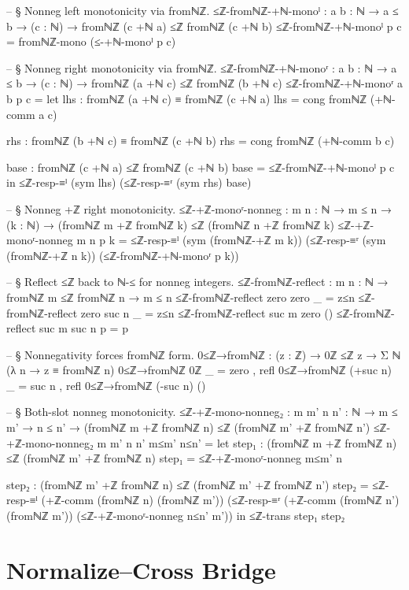 \documentclass[11pt,a4paper]{book}
\begin{document}
\begin{code}
-- § Nonneg left monotonicity via fromℕℤ.
≤ℤ-fromℕℤ-+ℕ-monoˡ : {a b : ℕ} → a ≤ b → (c : ℕ) → fromℕℤ (c +ℕ a) ≤ℤ fromℕℤ (c +ℕ b)
≤ℤ-fromℕℤ-+ℕ-monoˡ p c = fromℕℤ-mono (≤-+ℕ-monoˡ p c)

-- § Nonneg right monotonicity via fromℕℤ.
≤ℤ-fromℕℤ-+ℕ-monoʳ : {a b : ℕ} → a ≤ b → (c : ℕ) → fromℕℤ (a +ℕ c) ≤ℤ fromℕℤ (b +ℕ c)
≤ℤ-fromℕℤ-+ℕ-monoʳ {a} {b} p c =
  let
    lhs : fromℕℤ (a +ℕ c) ≡ fromℕℤ (c +ℕ a)
    lhs = cong fromℕℤ (+ℕ-comm a c)

    rhs : fromℕℤ (b +ℕ c) ≡ fromℕℤ (c +ℕ b)
    rhs = cong fromℕℤ (+ℕ-comm b c)

    base : fromℕℤ (c +ℕ a) ≤ℤ fromℕℤ (c +ℕ b)
    base = ≤ℤ-fromℕℤ-+ℕ-monoˡ p c
  in
  ≤ℤ-resp-≡ˡ (sym lhs) (≤ℤ-resp-≡ʳ (sym rhs) base)

-- § Nonneg +ℤ right monotonicity.
≤ℤ-+ℤ-monoʳ-nonneg : {m n : ℕ} → m ≤ n → (k : ℕ) → (fromℕℤ m +ℤ fromℕℤ k) ≤ℤ (fromℕℤ n +ℤ fromℕℤ k)
≤ℤ-+ℤ-monoʳ-nonneg {m} {n} p k =
  ≤ℤ-resp-≡ˡ (sym (fromℕℤ-+ℤ m k))
    (≤ℤ-resp-≡ʳ (sym (fromℕℤ-+ℤ n k))
      (≤ℤ-fromℕℤ-+ℕ-monoʳ p k))

-- § Reflect ≤ℤ back to ℕ-≤ for nonneg integers.
≤ℤ-fromℕℤ-reflect : {m n : ℕ} → fromℕℤ m ≤ℤ fromℕℤ n → m ≤ n
≤ℤ-fromℕℤ-reflect {zero} {zero} _ = z≤n
≤ℤ-fromℕℤ-reflect {zero} {suc n} _ = z≤n
≤ℤ-fromℕℤ-reflect {suc m} {zero} ()
≤ℤ-fromℕℤ-reflect {suc m} {suc n} p = p

-- § Nonnegativity forces fromℕℤ form.
0≤ℤ→fromℕℤ : (z : ℤ) → 0ℤ ≤ℤ z → Σ ℕ (λ n → z ≡ fromℕℤ n)
0≤ℤ→fromℕℤ 0ℤ _ = zero , refl
0≤ℤ→fromℕℤ (+suc n) _ = suc n , refl
0≤ℤ→fromℕℤ (-suc n) ()

-- § Both-slot nonneg monotonicity.
≤ℤ-+ℤ-mono-nonneg₂ : {m m' n n' : ℕ} → m ≤ m' → n ≤ n' →
  (fromℕℤ m +ℤ fromℕℤ n) ≤ℤ (fromℕℤ m' +ℤ fromℕℤ n')
≤ℤ-+ℤ-mono-nonneg₂ {m} {m'} {n} {n'} m≤m' n≤n' =
  let
    step₁ : (fromℕℤ m +ℤ fromℕℤ n) ≤ℤ (fromℕℤ m' +ℤ fromℕℤ n)
    step₁ = ≤ℤ-+ℤ-monoʳ-nonneg m≤m' n

    step₂ : (fromℕℤ m' +ℤ fromℕℤ n) ≤ℤ (fromℕℤ m' +ℤ fromℕℤ n')
    step₂ =
      ≤ℤ-resp-≡ˡ (+ℤ-comm (fromℕℤ n) (fromℕℤ m'))
        (≤ℤ-resp-≡ʳ (+ℤ-comm (fromℕℤ n') (fromℕℤ m'))
          (≤ℤ-+ℤ-monoʳ-nonneg n≤n' m'))
  in
  ≤ℤ-trans step₁ step₂
\end{code}

\section{Normalize--Cross Bridge}
\end{document}
